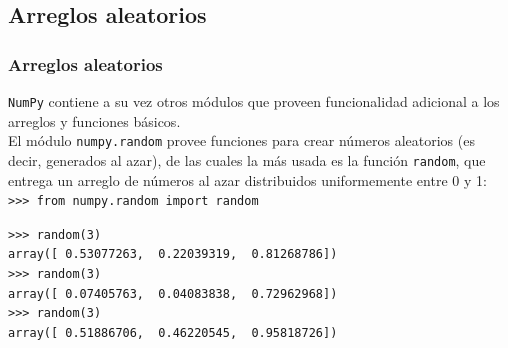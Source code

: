 \subsection{Arreglos aleatorios}
\begin{frame}[fragile]
\frametitle{Arreglos aleatorios}
\texttt{NumPy} contiene a su vez otros m\'{o}dulos que proveen funcionalidad adicional a los arreglos y funciones b\'{a}sicos.
\\
\bigskip
El m\'{o}dulo \texttt{numpy.random} provee funciones para crear n\'{u}meros aleatorios (es decir, generados al azar), de las cuales la m\'{a}s usada es la funci\'{o}n \texttt{random}, que entrega un arreglo de n\'{u}meros al azar distribuidos uniformemente entre 0 y 1:
\\
\bigskip
\verb|>>> from numpy.random import random|
\end{frame}
\begin{frame}[fragile]
\fontsize{12}{12}\selectfont
\begin{exampleblock}{}
\verb|>>> random(3)| \\
\pause
\verb|array([ 0.53077263,  0.22039319,  0.81268786])| \\
\verb|>>> random(3)| \\
\pause
\verb|array([ 0.07405763,  0.04083838,  0.72962968])| \\
\pause
\verb|>>> random(3)| \\
\pause
\verb|array([ 0.51886706,  0.46220545,  0.95818726])|
\end{exampleblock}
\end{frame}
